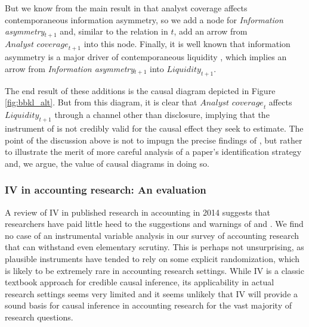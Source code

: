 \documentclass[11pt,reqno,titlepage]{amsart}
\begin{document}
\begin{doublespace}
But we know from the main result in \citet{Kelly:2012ih} that analyst coverage affects contemporaneous information asymmetry, so we add a node for \textit{Information asymmetry}$_{t+1}$ and, similar to the relation in $t$, add an arrow from $\textit{Analyst coverage}_{t+1}$ into this node.
Finally, it is well known that information asymmetry is a major driver of contemporaneous liquidity \citep{Glosten:1988gd}, which implies an arrow from \emph{Information asymmetry}$_{t+1}$ into $\textit{Liquidity}_{t+1}$.

The end result of these additions is the causal diagram depicted in Figure \ref{fig:bbkl_alt}.
But from this diagram, it is clear that $\textit{Analyst coverage}_t$ affects $\textit{Liquidity}_{t+1}$ through a channel other than disclosure, implying that the instrument of \citet{Balakrishnan:2014js} is not credibly valid for the causal effect they seek to estimate. 
The point of the discussion above is not to impugn the precise findings of \citet{Balakrishnan:2014js}, but rather to illustrate the merit of more careful analysis of a paper's identification strategy and, we argue, the value of causal diagrams in doing so.

\subsubsection{IV in accounting research: An evaluation}
A review of IV in published research in accounting in 2014 suggests that researchers have paid little heed to the suggestions and warnings of  \citet{Larcker:2010fq} and \citet{Roberts:2013cz}.
We find no case of an instrumental variable analysis in our survey of accounting research that can withstand even elementary scrutiny.
This is perhaps not unsurprising, as plausible instruments have tended to rely on some explicit randomization, which is likely to be extremely rare in accounting research settings.
While IV is a classic textbook approach for credible causal inference, its applicability in actual research settings seems very limited and it seems unlikely that IV will provide a sound basis for causal inference in accounting research for the vast majority of research questions.
 

\end{doublespace}
\end{document}

